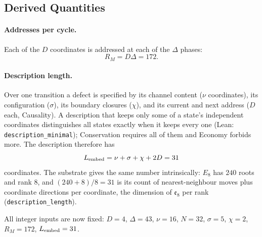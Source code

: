 \subsection{Derived Quantities}
\label{subsec:manifold_resolution}
\label{sec:resolution_limits}
\paragraph{Addresses per cycle.} Each of the $D$ coordinates is addressed at each of the $\Delta$ phases:
\begin{equation}
R_M=D\Delta=172.
\end{equation}

\paragraph{Description length.}
\label{par:lembed}
Over one transition a defect is specified by its channel content ($\nu$ coordinates), its configuration ($\sigma$), its boundary closures ($\chi$), and its current and next address ($D$ each, Causality). A description that keeps only some of a state's independent coordinates distinguishes all states exactly when it keeps every one (Lean: \texttt{description\_minimal}); Conservation requires all of them and Economy forbids more. The description therefore has
\begin{equation}
L_{\rm embed}=\nu+\sigma+\chi+2D=31
\end{equation}
coordinates. The substrate gives the same number intrinsically: $E_8$ has $240$ roots and rank $8$, and $(240+8)/8=31$ is its count of nearest-neighbour moves plus coordinate directions per coordinate, the dimension of $\mathfrak e_8$ per rank (\texttt{description\_length}).

All integer inputs are now fixed: $D=4$, $\Delta=43$, $\nu=16$, $N=32$, $\sigma=5$, $\chi=2$, $R_M=172$, $L_{\rm embed}=31$.
